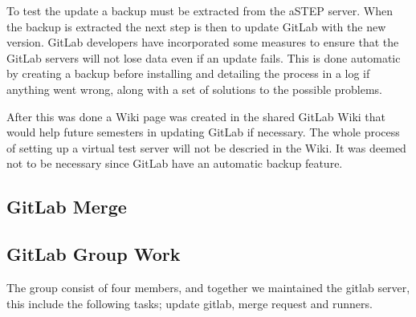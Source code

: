 
To test the update a backup must be extracted from the aSTEP server. %
When the backup is extracted the next step is then to update GitLab with the new version. GitLab developers have incorporated some measures to ensure that the GitLab servers will not lose data even if an update fails. This is done automatic by creating a backup before installing and detailing the process in a log if anything went wrong, along with a set of solutions to the possible problems.

After this was done a Wiki page was created in the shared GitLab Wiki that would help future semesters in updating GitLab if necessary. The whole process of setting up a virtual test server will not be descried in the Wiki. It was deemed not to be necessary since GitLab have an automatic backup feature.

\subsection*{GitLab Merge}

\subsection*{GitLab Group Work}
The group consist of four members, and together we maintained the gitlab server, this include the following tasks; update gitlab, merge request and runners.